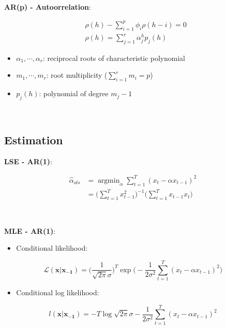 \documentclass[
]{book}
\providecommand{\tightlist}{%
  \setlength{\itemsep}{0pt}\setlength{\parskip}{0pt}}
\begin{document}
~

\textbf{AR(p) - Autoorrelation}:

\[\begin{align*}
        &\rho(h)-\sum_{i=1}^{p}{\phi_i\rho(h-i)}=0\\
        &\rho(h)=\sum_{j=1}^{r}{\alpha_j^hp_j(h)}
    \end{align*}\]

\begin{itemize}
\tightlist
\item
  \(\alpha_1,\cdots,\alpha_r\): reciprocal roots of characteristic
  polynomial
\item
  \(m_1,\cdots,m_r\): root multiplicity (\(\sum_{i=1}^r{m_i}=p\))
\item
  \(p_j(h)\): polynomial of degree \(m_j-1\)
\end{itemize}

~

\hypertarget{estimation}{%
\subsection{Estimation}\label{estimation}}

\textbf{LSE - AR(1)}:

\[\begin{align*}
        \hat{\alpha}_{ols}&=\mathop{\mathrm{argmin}}_{\alpha}{\sum_{t=1}^{T}{(x_t-\alpha x_{t-1})^2}}\\
        &=\bigg(\sum_{t=1}^{T}{x_{t-1}^2}\bigg)^{-1}\bigg(\sum_{t=1}^{T}{x_{t-1}x_t}\bigg)
    \end{align*}\]

~

\textbf{MLE - AR(1)}:

\begin{itemize}
\tightlist
\item
  Conditional likelihood:
\end{itemize}

\[\begin{equation*}
        \mathcal{L}(\bm{x|x_{-1}})=\bigg(\frac{1}{\sqrt{2\pi}\sigma}\bigg)^T\exp{\bigg(-\frac{1}{2\sigma^2}\sum_{t=1}^{T}{(x_t-\alpha x_{t-1})^2}\bigg)}
    \end{equation*}\]

\begin{itemize}
\tightlist
\item
  Conditional log likelihood:
\end{itemize}

\[\begin{equation*}
        l(\bm{x|x_{-1}})=-T\log{\sqrt{2\pi}\sigma}-\frac{1}{2\sigma^2}\sum_{t=1}^{T}{(x_t-\alpha x_{t-1})^2}
    \end{equation*}\]
\end{document}
